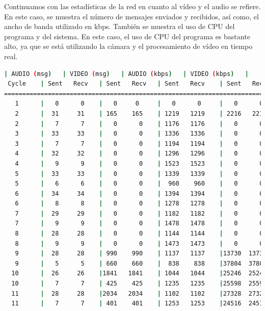 Continuamos con las estadísticas de la red en cuanto al vídeo y el audio se refiere. En este caso, se muestra el número de mensajes enviados y recibidos, así como, el ancho de banda utilizado en kbps. También se muestra el uso de CPU del programa y del sistema. En este caso, el uso de CPU del programa es bastante alto, ya que se está utilizando la cámara y el procesamiento de vídeo en tiempo real. 
\begin{lstlisting}[language=bash,basicstyle=\ttfamily\scriptsize]
           | AUDIO (msg)   | VIDEO (msg)   | AUDIO (kbps)   | VIDEO (kbps)   |    CPU (%)
 Cycle    | Sent   Recv   | Sent   Recv   | Sent   Recv    | Sent   Recv    | Program System
============================================================================================
   1      |   0      0    |   0     0     |   0      0     |   0      0     |  0      0
   2      |  31     31    | 165    165    | 1219   1219    | 2216   2216    | 25     65
   2      |   7      7    |   0      0    | 1176   1176    |   0      0     | 35     64
   3      |  33     33    |   0      0    | 1336   1336    |   0      0     | 38     65
   3      |   7      7    |   0      0    | 1194   1194    |   0      0     | 15     65
   4      |  32     32    |   0      0    | 1296   1296    |   0      0     | 39     66
   4      |   9      9    |   0      0    | 1523   1523    |   0      0     | 51     69
   5      |  33     33    |   0      0    | 1339   1339    |   0      0     | 37     67
   5      |   6      6    |   0      0    |  960    960    |   0      0     | 39     65
   6      |  34     34    |   0      0    | 1394   1394    |   0      0     | 43     71
   6      |   8      8    |   0      0    | 1278   1278    |   0      0     | 43     73
   7      |  29     29    |   0      0    | 1182   1182    |   0      0     | 39     71
   7      |   9      9    |   0      0    | 1478   1478    |   0      0     | 50     70
   8      |  28     28    |   0      0    | 1144   1144    |   0      0     | 52     72
   8      |   9      9    |   0      0    | 1473   1473    |   0      0     | 54     73
   9      |  28     28    | 990    990    | 1137   1137    |13730  13730    | 48     71
   9      |   5      5    | 660    660    |  838    838    |37804  37804    | 51     69
  10      |  26     26    |1841   1841    | 1044   1044    |25246  25246    | 40     65
  10      |   7      7    | 425    425    | 1235   1235    |25598  25598    | 53     64
  11      |  28     28    |2034   2034    | 1102   1102    |27328  27328    | 50     69
  11      |   7      7    | 401    401    | 1253   1253    |24516  24516    | 60     72

\end{lstlisting}
